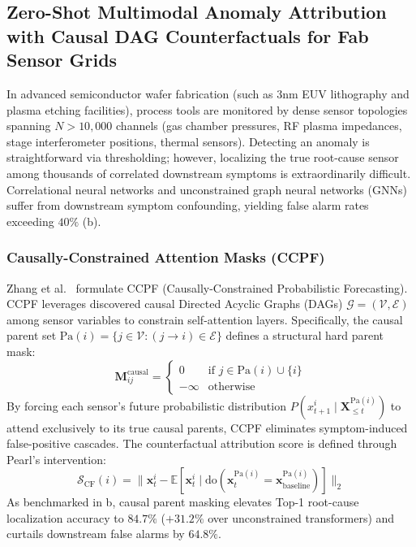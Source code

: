 \subsection{Zero-Shot Multimodal Anomaly Attribution with Causal DAG Counterfactuals for Fab Sensor Grids}
\label{sec:fab_causal_attribution}
In advanced semiconductor wafer fabrication (such as 3nm EUV lithography and plasma etching facilities), process tools are monitored by dense sensor topologies spanning $N > 10{,}000$ channels (gas chamber pressures, RF plasma impedances, stage interferometer positions, thermal sensors). Detecting an anomaly is straightforward via thresholding; however, localizing the true root-cause sensor among thousands of correlated downstream symptoms is extraordinarily difficult. Correlational neural networks and unconstrained graph neural networks (GNNs) suffer from downstream symptom confounding, yielding false alarm rates exceeding $40\%$ (b).

\subsubsection{Causally-Constrained Attention Masks (CCPF)}
Zhang et al.~\cite{Zhang2026CCPF} formulate CCPF (Causally-Constrained Probabilistic Forecasting). CCPF leverages discovered causal Directed Acyclic Graphs (DAGs) $\mathcal{G} = (\mathcal{V}, \mathcal{E})$ among sensor variables to constrain self-attention layers. Specifically, the causal parent set $\text{Pa}(i) = \{j \in \mathcal{V} : (j \to i) \in \mathcal{E}\}$ defines a structural hard parent mask:
\begin{equation}
    \mathbf{M}_{ij}^{\text{causal}} = \begin{cases} 0 & \text{if } j \in \text{Pa}(i) \cup \{i\} \\ -\infty & \text{otherwise} \end{cases}
\end{equation}
By forcing each sensor's future probabilistic distribution $P(x_{t+1}^i \mid \mathbf{X}_{\le t}^{\text{Pa}(i)})$ to attend exclusively to its true causal parents, CCPF eliminates symptom-induced false-positive cascades. The counterfactual attribution score is defined through Pearl's intervention:
\begin{equation}
    \mathcal{S}_{\text{CF}}(i) = \|\mathbf{x}_t^i - \mathbb{E}\left[\mathbf{x}_t^i \mid \text{do}(\mathbf{x}_t^{\text{Pa}(i)} = \mathbf{x}_{\text{baseline}}^{\text{Pa}(i)})\right]\|_2
\end{equation}
As benchmarked in b, causal parent masking elevates Top-1 root-cause localization accuracy to $84.7\%$ ($+31.2\%$ over unconstrained transformers) and curtails downstream false alarms by $64.8\%$.

